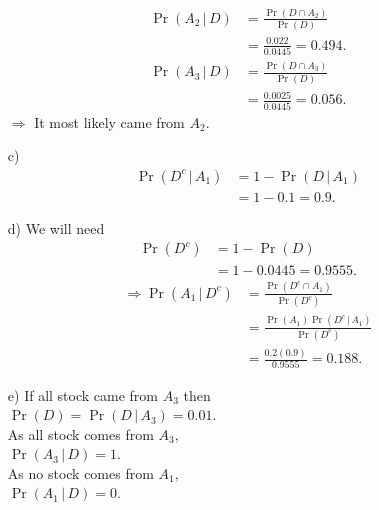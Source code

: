 \documentclass[12pt]{article}
\begin{document}
{\begin{minipage}[t]{0.98\textwidth}
\begin{minipage}[t]{0.47\textwidth}
\begin{enumerate}
\item[] \qquad\\[-1.3cm]
\begin{align*}
\Pr(A_2\,|\,D) &= \frac{\Pr(D \cap A_2)}{\Pr(D)} \\
               &= \frac{0.022}{0.0445} = 0.494.\\[0.4cm]
\Pr(A_3\,|\,D) &= \frac{\Pr(D \cap A_3)}{\Pr(D)} \\
               &= \frac{0.0025}{0.0445} = 0.056.
\end{align*}
$\Rightarrow$ It most likely came from $A_2$.
\item[c)] \quad\\[-1.4cm]
\begin{align*}
\Pr(D^c\,|\,A_1) &= 1 - \Pr(D\,|\,A_1) \\ &= 1 - 0.1 = 0.9.
\end{align*}
\item[d)] We will need\\[-0.8cm]
\begin{align*}
\Pr(D^c) &= 1 - \Pr(D) \\ &= 1 - 0.0445 = 0.9555.
\end{align*}
\begin{align*}
\Rightarrow \Pr(A_1\,|\,D^c) &= \frac{\Pr(D^c \cap A_1)}{\Pr(D^c)} \\
               &= \frac{\Pr(A_1) \Pr(D^c\,|\,A_1)}{\Pr(D^c)} \\
               &= \frac{0.2(0.9)}{0.9555} = 0.188.
\end{align*}
\item[e)] If all stock came from $A_3$ then\\$\Pr(D) = \Pr(D\,|\,A_3) = 0.01$.\\[0.3cm]
    As all stock comes from $A_3$,\\$\Pr(A_3\,|\,D) = 1$.\\[0.3cm]
        As no stock comes from $A_1$,\\$\Pr(A_1\,|\,D) = 0$.
\end{enumerate}
\end{minipage}
\end{minipage}}\vspace{0.03\textwidth}
\end{document}
